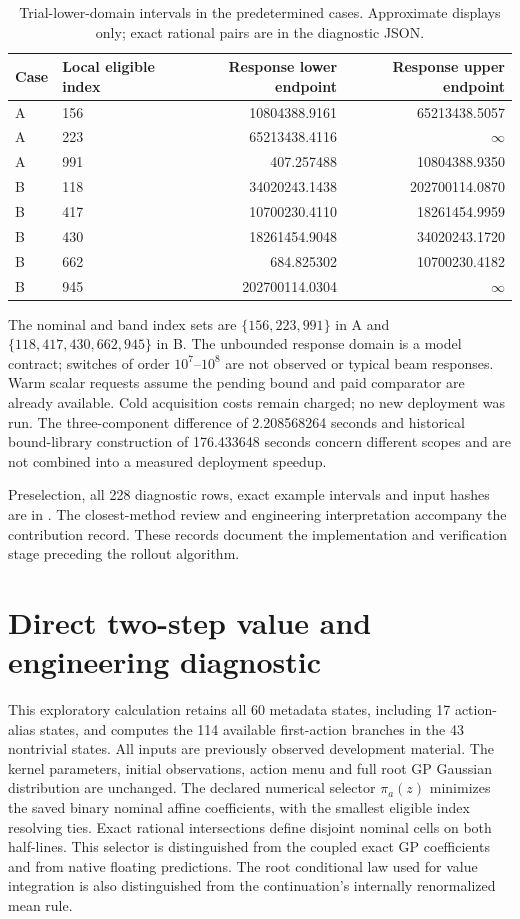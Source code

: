 \begin{table}[htbp]\centering\small
\caption{Trial-lower-domain intervals in the predetermined cases. Approximate displays only; exact rational pairs are in the diagnostic JSON.}
\begin{tabular}{llrr}\toprule
Case & Local eligible index & Response lower endpoint & Response upper endpoint\\\midrule
A & 156 & 10804388.9161 & 65213438.5057\\
A & 223 & 65213438.4116 & $\infty$\\
A & 991 & 407.257488 & 10804388.9350\\
B & 118 & 34020243.1438 & 202700114.0870\\
B & 417 & 10700230.4110 & 18261454.9959\\
B & 430 & 18261454.9048 & 34020243.1720\\
B & 662 & 684.825302 & 10700230.4182\\
B & 945 & 202700114.0304 & $\infty$\\\bottomrule
\end{tabular}\end{table}

The nominal and band index sets are $\{156,223,991\}$ in A and $\{118,417,430,662,945\}$ in B. The unbounded response domain is a model contract; switches of order $10^7$--$10^8$ are not observed or typical beam responses. Warm scalar requests assume the pending bound and paid comparator are already available. Cold acquisition costs remain charged; no new deployment was run. The three-component difference of 2.208568264 seconds and historical bound-library construction of 176.433648 seconds concern different scopes and are not combined into a measured deployment speedup.

Preselection, all 228 diagnostic rows, exact example intervals and input hashes are in . The closest-method review and engineering interpretation accompany the contribution record. These records document the implementation and verification stage preceding the rollout algorithm.

\section{Direct two-step value and engineering diagnostic}

This exploratory calculation retains all 60 metadata states, including 17 action-alias states, and computes the 114 available first-action branches in the 43 nontrivial states. All inputs are previously observed development material. The kernel parameters, initial observations, action menu and full root GP Gaussian distribution are unchanged. The declared numerical selector $\pi_a(z)$ minimizes the saved binary nominal affine coefficients, with the smallest eligible index resolving ties. Exact rational intersections define disjoint nominal cells on both half-lines. This selector is distinguished from the coupled exact GP coefficients and from native floating predictions. The root conditional law used for value integration is also distinguished from the continuation's internally renormalized mean rule.

